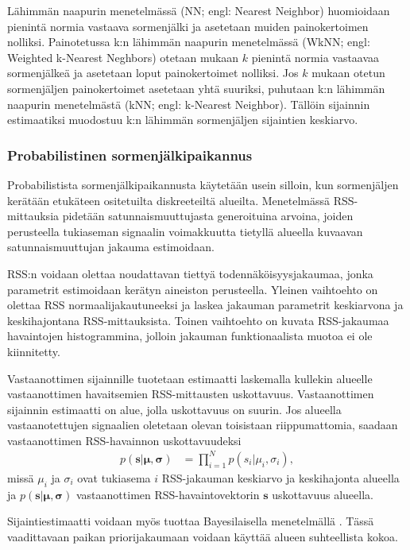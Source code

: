 Lähimmän naapurin menetelmässä (NN; engl: Nearest Neighbor) huomioidaan
pienintä normia vastaava sormenjälki ja asetetaan muiden painokertoimen
nolliksi. Painotetussa k:n lähimmän naapurin menetelmässä (WkNN;
engl: Weighted k-Nearest Neghbors) otetaan mukaan $k$ pienintä normia
vastaavaa sormenjälkeä ja asetetaan loput painokertoimet nolliksi. Jos
$k$ mukaan otetun sormenjäljen painokertoimet asetetaan yhtä suuriksi,
puhutaan k:n lähimmän naapurin menetelmästä (kNN; engl: k-Nearest Neighbor).
Tällöin sijainnin estimaatiksi muodostuu k:n lähimmän sormenjäljen
sijaintien keskiarvo.

\subsubsection{Probabilistinen sormenjälkipaikannus}

Probabilistista sormenjälkipaikannusta käytetään usein silloin,
kun sormenjäljen kerätään etukäteen ositetuilta diskreeteiltä alueilta.
Menetelmässä RSS-mittauksia pidetään satunnaismuuttujasta generoituina
arvoina, joiden perusteella tukiaseman signaalin voimakkuutta tietyllä
alueella kuvaavan satunnaismuuttujan jakauma estimoidaan.

RSS:n voidaan olettaa noudattavan tiettyä todennäköisyysjakaumaa, jonka
parametrit estimoidaan kerätyn aineiston perusteella. Yleinen
vaihtoehto on olettaa RSS normaalijakautuneeksi ja laskea jakauman
parametrit keskiarvona ja keskihajontana RSS-mittauksista. Toinen vaihtoehto
on kuvata RSS-jakaumaa havaintojen histogrammina, jolloin jakauman
funktionaalista muotoa ei ole kiinnitetty.

Vastaanottimen sijainnille tuotetaan estimaatti laskemalla kullekin alueelle
vastaanottimen havaitsemien RSS-mittausten uskottavuus. Vastaanottimen
sijainnin estimaatti on alue, jolla uskottavuus on suurin. Jos alueella
vastaanotettujen signaalien oletetaan olevan toisistaan riippumattomia,
saadaan vastaanottimen RSS-havainnon uskottavuudeksi
\begin{align}
  p(\mathbf{s} | \mathbf{\mu},\mathbf{\sigma}) &= 
  \prod_{i=1}^N p(s_i | \mu_i, \sigma_i),
\end{align}
missä $\mu_i$ ja $\sigma_i$ ovat tukiasema $i$ RSS-jakauman keskiarvo ja
keskihajonta alueella ja $p(\mathbf{s}|\mathbf{\mu},\mathbf{\sigma})$
vastaanottimen RSS-havaintovektorin $\mathbf{s}$ uskottavuus alueella.

Sijaintiestimaatti voidaan myös tuottaa Bayesilaisella menetelmällä
\cite{honkavirta2009}. Tässä vaadittavaan paikan priorijakaumaan
voidaan käyttää alueen suhteellista kokoa.

